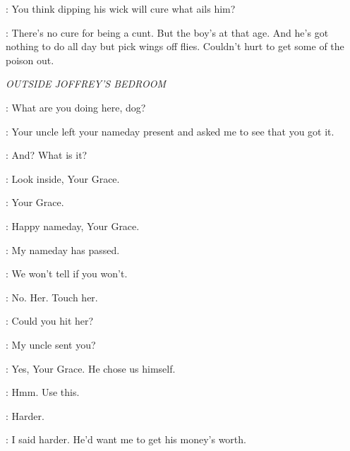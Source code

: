 \TYRION: You think dipping his wick will cure what ails him? 

\BRONN: There's no cure for being a cunt. But the boy's at that age. And he's got nothing to do all day but pick wings off flies. Couldn't hurt to get some of the poison out. 


\scene

\textit{OUTSIDE JOFFREY'S BEDROOM}


\JOFFREY: What are you doing here, dog? 

\HOUND: Your uncle left your nameday present and asked me to see that you got it. 

\JOFFREY: And? What is it? 

\HOUND: Look inside, Your Grace. 


\DAISY: Your Grace. 

\ROS: Happy nameday, Your Grace. 

\JOFFREY: My nameday has passed. 

\ROS: We won't tell if you won't. 


\JOFFREY: No. Her. Touch her. 


\JOFFREY: Could you hit her? 


\JOFFREY: My uncle sent you? 

\ROS: Yes, Your Grace. He chose us himself. 

\JOFFREY: Hmm. Use this. 


\JOFFREY: Harder. 


\JOFFREY: I said harder. He'd want me to get his money's worth. 



